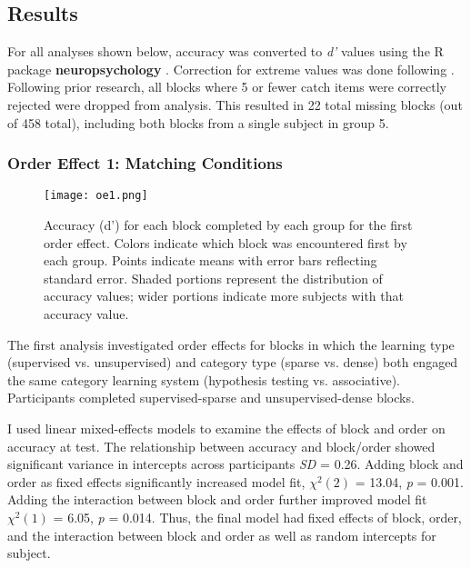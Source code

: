\documentclass[../dissertation.tex]{subfiles}
\begin{document}
\subsection{Results}
	For all analyses shown below, accuracy was converted to \textit{d'} values \citep{macmillan2004} using the R package \textbf{neuropsychology} \citep{neuropsych}. Correction for extreme values was done following \citep{Hautus1995}. Following prior research, all blocks where 5 or fewer catch items were correctly rejected were dropped from analysis. This resulted in 22 total missing blocks (out of 458 total), including both blocks from a single subject in group 5. \par
	
\subsubsection{Order Effect 1: Matching Conditions}
\begin{wrapfigure}{r}{0.5\textwidth}
\vspace{-10pt}
\texttt{[image: oe1.png]}
\caption[Accuracy plot for order effect 1]{Accuracy (d') for each block completed by each group for the first order effect. Colors indicate which block was encountered first by each group. Points indicate means with error bars reflecting standard error. Shaded portions represent the distribution of accuracy values; wider portions indicate more subjects with that accuracy value.}
\label{oe1}
\vspace{-10pt}
\end{wrapfigure}	
	The first analysis investigated order effects for blocks in which the learning type (supervised vs. unsupervised) and category type (sparse vs. dense) both engaged the same category learning system (hypothesis testing vs. associative). Participants completed supervised-sparse and unsupervised-dense blocks. \par
	I used linear mixed-effects models to examine the effects of block and order on accuracy at test. The relationship between accuracy and block/order showed significant variance in intercepts across participants \textit{SD} = 0.26. Adding block and order as fixed effects significantly increased model fit, $\chi^{2}(2)$ = 13.04,  \textit{p} = 0.001. Adding the interaction between block and order further improved model fit $\chi^{2}(1)$ = 6.05,  \textit{p} = 0.014. Thus, the final model had fixed effects of block, order, and the interaction between block and order as well as random intercepts for subject. \par
\end{document}
